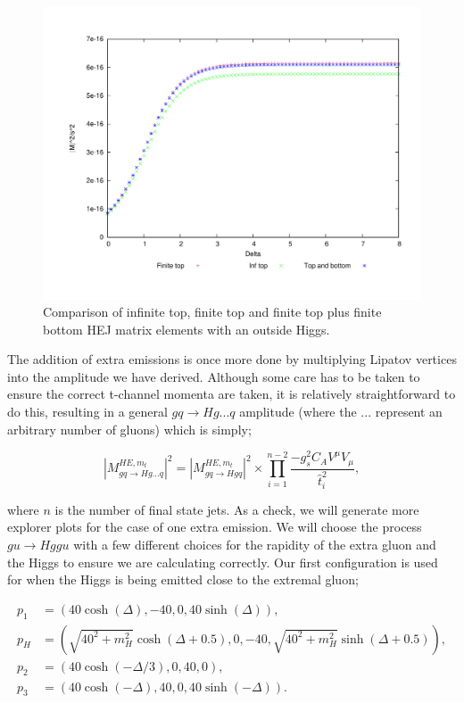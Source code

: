 \begin{figure}[H]
\centering
\includegraphics[scale=0.5]{Images/qg_qgH_compare_outside.pdf}
\caption{Comparison of infinite top, finite top and finite top plus finite bottom HEJ matrix elements with an outside Higgs.}
\label{fig:qg_qgh_compare_out}
\end{figure}

The addition of extra emissions is once more done by multiplying Lipatov vertices into the amplitude we have derived. Although some care has to be taken to ensure the correct t-channel momenta are taken, it is relatively straightforward to do this, resulting in a general $gq\to Hg...q$ amplitude (where the ... represent an arbitrary number of gluons) which is simply;

\begin{equation}
|M_{gq \to Hg...q}^{HE,m_t}|^2 = |M_{gq \to Hgq}^{HE,m_t}|^2 \times \prod_{i=1}^{n-2} \frac{-g_s^2C_A V^\mu V_\mu}{\hat{t}_i^2},
\end{equation}

where $n$ is the number of final state jets. As a check, we will generate more explorer plots for the case of one extra emission. We will choose the process $gu \to Hggu$ with a few different choices for the rapidity of the extra gluon and the Higgs to ensure we are calculating correctly. Our first configuration is used for when the Higgs is being emitted close to the extremal gluon;

\begin{subequations}
\begin{align}
p_1 &= (40 \cosh(\Delta),-40,0,40 \sinh(\Delta)), \\
p_H &= (\sqrt{40^2+m_H^2} \cosh(\Delta+0.5), 0,-40,\sqrt{40^2+m_H^2}  \sinh(\Delta+0.5)), \\
p_2 &= (40 \cosh(-\Delta/3),0,40,0), \\
p_3 &= (40 \cosh(-\Delta),40,0,40 \sinh(-\Delta)).
\end{align}
\end{subequations}

